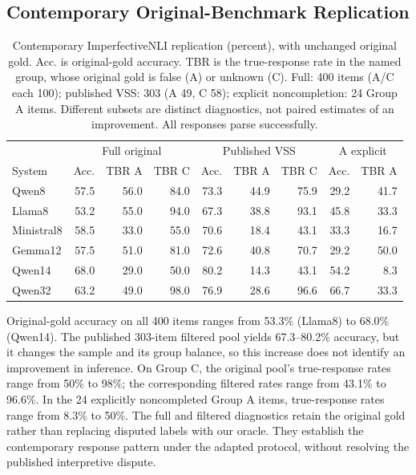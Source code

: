 \documentclass[sigconf,anonymous,review]{acmart}
\begin{document}
\subsection{Contemporary Original-Benchmark Replication}
\begin{table}[t]
\centering
\caption{Contemporary ImperfectiveNLI replication (percent), with unchanged original gold. Acc. is original-gold accuracy. TBR is the true-response rate in the named group, whose original gold is false (A) or unknown (C). Full: 400 items (A/C each 100); published VSS: 303 (A 49, C 58); explicit noncompletion: 24 Group A items. Different subsets are distinct diagnostics, not paired estimates of an improvement. All responses parse successfully.}
\label{tab:replication_results}
\setlength{\tabcolsep}{5pt}
\begin{tabular}{lrrrrrrrr}
\toprule
 & \multicolumn{3}{c}{Full original} & \multicolumn{3}{c}{Published VSS} & \multicolumn{2}{c}{A explicit}\\
System & Acc. & TBR A & TBR C & Acc. & TBR A & TBR C & Acc. & TBR A\\
\midrule
Qwen8 & 57.5 & 56.0 & 84.0 & 73.3 & 44.9 & 75.9 & 29.2 & 41.7 \\
Llama8 & 53.2 & 55.0 & 94.0 & 67.3 & 38.8 & 93.1 & 45.8 & 33.3 \\
Ministral8 & 58.5 & 33.0 & 55.0 & 70.6 & 18.4 & 43.1 & 33.3 & 16.7 \\
Gemma12 & 57.5 & 51.0 & 81.0 & 72.6 & 40.8 & 70.7 & 29.2 & 50.0 \\
Qwen14 & 68.0 & 29.0 & 50.0 & 80.2 & 14.3 & 43.1 & 54.2 & 8.3 \\
Qwen32 & 63.2 & 49.0 & 98.0 & 76.9 & 28.6 & 96.6 & 66.7 & 33.3 \\
\bottomrule
\end{tabular}
\end{table}
Original-gold accuracy on all 400 items ranges from 53.3\% (Llama8) to 68.0\% (Qwen14). The published 303-item filtered pool yields 67.3--80.2\% accuracy, but it changes the sample and its group balance, so this increase does not identify an improvement in inference. On Group C, the original pool's true-response rates range from 50\% to 98\%; the corresponding filtered rates range from 43.1\% to 96.6\%. In the 24 explicitly noncompleted Group A items, true-response rates range from 8.3\% to 50\%. The full and filtered diagnostics retain the original gold rather than replacing disputed labels with our oracle. They establish the contemporary response pattern under the adapted protocol, without resolving the published interpretive dispute.
\end{document}
